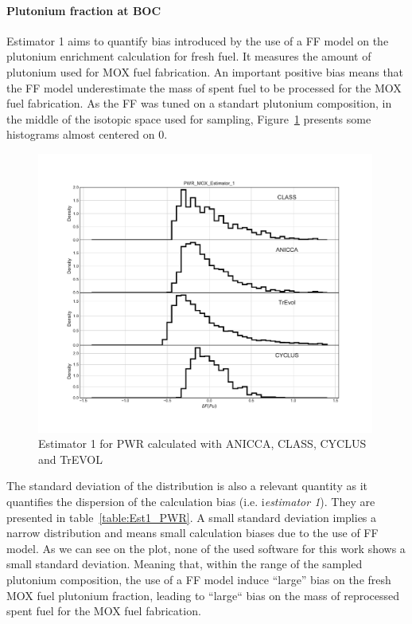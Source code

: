 \paragraph{Plutonium fraction at \gls{BOC}}

Estimator 1 aims to quantify bias introduced by the use of a \gls{FF} model on
the plutonium enrichment calculation for fresh fuel. It measures the amount of
plutonium used for \gls{MOX} fuel fabrication. An important positive bias means
that the \gls{FF} model underestimate the mass of spent fuel to be processed for
the MOX fuel fabrication. As the \gls{FF} was tuned on a standart plutonium
composition, in the middle of the isotopic space used for sampling,
Figure~\ref{fig:Est1_PWR} presents some histograms almost centered on 0.
        

\begin{figure}[h]
	\begin{center}
		\includegraphics[width = 0.99\textwidth]{../../Feature_1/RAW_DATA/FIG/PWR_MOX_Estimator_1.pdf}
		\caption{Estimator 1 for \gls{PWR} calculated with ANICCA, CLASS, CYCLUS and TrEVOL}
		\label{fig:Est1_PWR}
	\end{center}
\end{figure}

The standard deviation of the distribution is also a relevant quantity as it
quantifies the dispersion of the calculation bias (i.e. i\textit{estimator 1}).
They are presented in table~\ref{table:Est1_PWR}. A small standard deviation
implies a narrow distribution and means small calculation biases due to the use
of \gls{FF} model. As we can see on the plot, none of the used software for this
work shows a small standard deviation. Meaning that, within the range of the
sampled plutonium composition, the use of a \gls{FF} model induce ``large'' bias
on the fresh \gls{MOX} fuel plutonium fraction, leading to ``large`` bias on the
mass of reprocessed spent fuel for the \gls{MOX} fuel fabrication.

